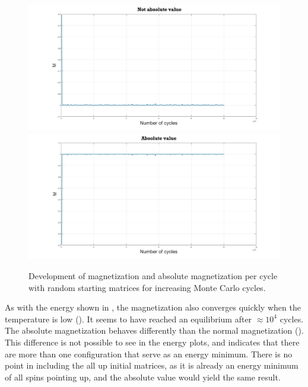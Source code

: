\documentclass[10pt,a4paper]{article}
\begin{document}
\begin{figure} [H]
\centerline{
\includegraphics[scale=0.15]{RANDOMmag1notabs.jpg}
\includegraphics[scale=0.15]{RANDOMmag1abs.jpg}
}
\caption{Development of magnetization and absolute magnetization per cycle with random starting matrices for increasing Monte Carlo cycles.}
\label{fig:RandomMag1}
\end{figure}

\noindent As with the energy shown in , the magnetization also converges quickly when the temperature is low (). It seems to have reached an equilibrium after $\approx 10^4$ cycles. The absolute magnetization behaves differently than the normal magnetization (). This difference is not possible to see in the energy plots, and indicates that there are more than one configuration that serve as an energy minimum. There is no point in including the all up initial matrices, as it is already an energy minimum of all spins pointing up, and the absolute value would yield the same result.  
\end{document}
